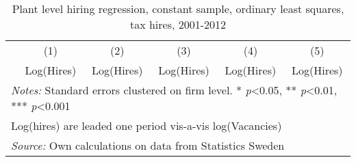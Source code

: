 \begin{table}[htbp]\centering
\def\sym#1{\ifmmode^{#1}\else\(^{#1}\)\fi}
\caption{Plant level hiring regression, constant sample, ordinary least squares, tax hires, 2001-2012}
\label{tab:plantlevel_rel:constant_sample}
\begin{tabular}{l*{5}{c}}
\hline\hline
                &\multicolumn{1}{c}{(1)}&\multicolumn{1}{c}{(2)}&\multicolumn{1}{c}{(3)}&\multicolumn{1}{c}{(4)}&\multicolumn{1}{c}{(5)}\\
                &\multicolumn{1}{c}{Log(Hires)}&\multicolumn{1}{c}{Log(Hires)}&\multicolumn{1}{c}{Log(Hires)}&\multicolumn{1}{c}{Log(Hires)}&\multicolumn{1}{c}{Log(Hires)}\\
\hline


\hline 


\hline\hline
\multicolumn{6}{l}{\footnotesize \emph{Notes:} Standard errors clustered on firm level. * \emph{p}<0.05, ** \emph{p}<0.01, *** \emph{p}<0.001}\\
\multicolumn{6}{l}{\footnotesize Log(hires) are leaded one period vis-a-vis log(Vacancies)}\\
\multicolumn{6}{l}{\footnotesize \emph{Source:} Own calculations on data from Statistics Sweden}\\
\end{tabular}
\end{table}


